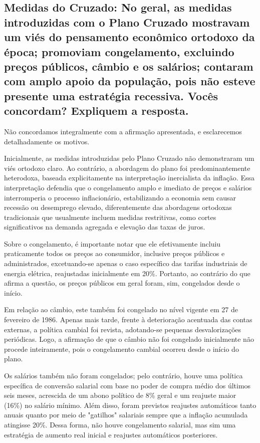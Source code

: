 \documentclass[a4paper,12pt]{article}[abntex2]
\begin{document}
\subsection{\textbf{Medidas do Cruzado: No geral, as medidas introduzidas com o Plano Cruzado mostravam um viés do pensamento econômico ortodoxo da época; promoviam congelamento, excluindo preços públicos, câmbio e os salários; contaram com amplo apoio da população, pois não esteve presente uma estratégia recessiva. Vocês concordam? Expliquem a resposta.}}

Não concordamos integralmente com a afirmação apresentada, e esclarecemos detalhadamente os motivos.

Inicialmente, as medidas introduzidas pelo Plano Cruzado não demonstraram um viés ortodoxo claro. Ao contrário, a abordagem do plano foi predominantemente heterodoxa, baseada explicitamente na interpretação inercialista da inflação. Essa interpretação defendia que o congelamento amplo e imediato de preços e salários interromperia o processo inflacionário, estabilizando a economia sem causar recessão ou desemprego elevado, diferentemente das abordagens ortodoxas tradicionais que usualmente incluem medidas restritivas, como cortes significativos na demanda agregada e elevação das taxas de juros.

Sobre o congelamento, é importante notar que ele efetivamente incluiu praticamente todos os preços ao consumidor, inclusive preços públicos e administrados, excetuando-se apenas o caso específico das tarifas industriais de energia elétrica, reajustadas inicialmente em 20\%. Portanto, ao contrário do que afirma a questão, os preços públicos em geral foram, sim, congelados desde o início.

Em relação ao câmbio, este também foi congelado no nível vigente em 27 de fevereiro de 1986. Apenas mais tarde, frente à deterioração acentuada das contas externas, a política cambial foi revista, adotando-se pequenas desvalorizações periódicas. Logo, a afirmação de que o câmbio não foi congelado inicialmente não procede inteiramente, pois o congelamento cambial ocorreu desde o início do plano.

Os salários também não foram congelados; pelo contrário, houve uma política específica de conversão salarial com base no poder de compra médio dos últimos seis meses, acrescida de um abono político de 8\% geral e um reajuste maior (16\%) no salário mínimo. Além disso, foram previstos reajustes automáticos tanto anuais quanto por meio de "gatilhos" salariais sempre que a inflação acumulada atingisse 20\%. Dessa forma, não houve congelamento salarial, mas sim uma estratégia de aumento real inicial e reajustes automáticos posteriores.
\end{document}
